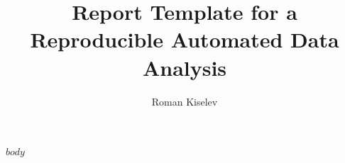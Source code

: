 \documentclass[a4paper]{scrartcl}
\title{Report Template for a Reproducible Automated Data Analysis}
\author{Roman Kiselev}
\begin{document}
    \maketitle

    $body$

    \tableofcontents
    
    
\end{document}
